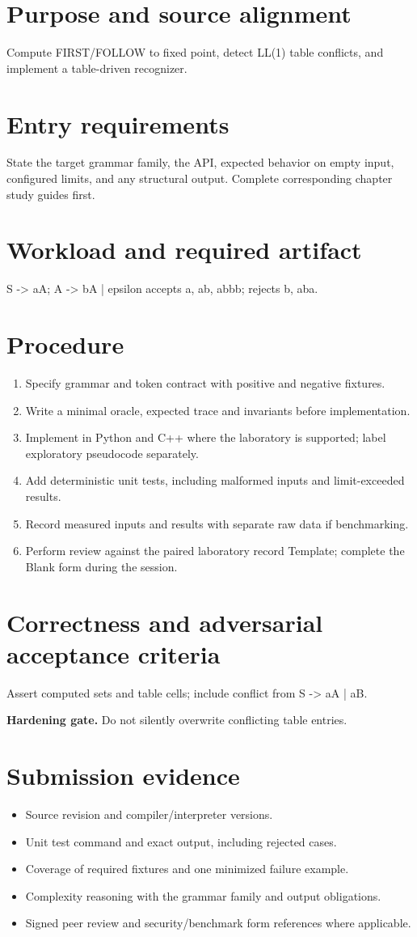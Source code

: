 \documentclass[11pt,letterpaper]{article}
\begin{document}
\makedoctitle\makedocsummary
\tableofcontents\clearpage
\section{Purpose and source alignment}
Compute FIRST/FOLLOW to fixed point, detect LL(1) table conflicts, and implement a table-driven recognizer.
\section{Entry requirements}
State the target grammar family, the API, expected behavior on empty input, configured limits, and any structural output. Complete corresponding chapter study guides first.
\section{Workload and required artifact}
S -> aA; A -> bA | epsilon accepts a, ab, abbb; rejects b, aba.
\section{Procedure}
\begin{enumerate}\item Specify grammar and token contract with positive and negative fixtures.\item Write a minimal oracle, expected trace and invariants before implementation.\item Implement in Python and C++ where the laboratory is supported; label exploratory pseudocode separately.\item Add deterministic unit tests, including malformed inputs and limit-exceeded results.\item Record measured inputs and results with separate raw data if benchmarking.\item Perform review against the paired laboratory record Template; complete the Blank form during the session.\end{enumerate}
\section{Correctness and adversarial acceptance criteria}
Assert computed sets and table cells; include conflict from S -> aA | aB.\par\textbf{Hardening gate.} Do not silently overwrite conflicting table entries.
\section{Submission evidence}
\begin{itemize}\item Source revision and compiler/interpreter versions.\item Unit test command and exact output, including rejected cases.\item Coverage of required fixtures and one minimized failure example.\item Complexity reasoning with the grammar family and output obligations.\item Signed peer review and security/benchmark form references where applicable.\end{itemize}
\end{document}
